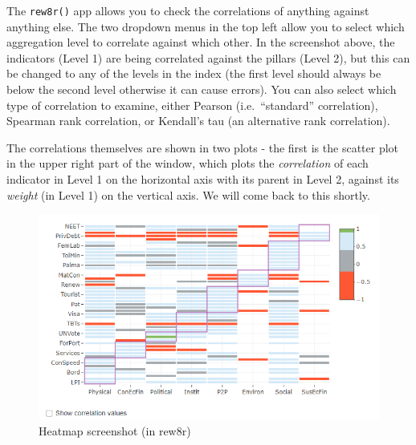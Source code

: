 \documentclass[
]{book}
\begin{document}
The \texttt{rew8r()} app allows you to check the correlations of anything against anything else. The two dropdown menus in the top left allow you to select which aggregation level to correlate against which other. In the screenshot above, the indicators (Level 1) are being correlated against the pillars (Level 2), but this can be changed to any of the levels in the index (the first level should always be below the second level otherwise it can cause errors). You can also select which type of correlation to examine, either Pearson (i.e.~``standard'' correlation), Spearman rank correlation, or Kendall's tau (an alternative rank correlation).

The correlations themselves are shown in two plots - the first is the scatter plot in the upper right part of the window, which plots the \emph{correlation} of each indicator in Level 1 on the horizontal axis with its parent in Level 2, against its \emph{weight} (in Level 1) on the vertical axis. We will come back to this shortly.

\begin{figure}

{\centering \includegraphics[width=1\linewidth]{images/corr_heatmap_screenshot_rew8r} 

}

\caption{Heatmap screenshot (in rew8r)}\label{fig:unnamed-chunk-70}
\end{figure}
\end{document}
